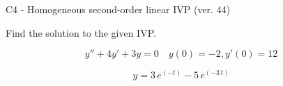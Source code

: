 \begin{exercise}
  \begin{exerciseTitle}C4 - Homogeneous second-order linear IVP (ver. 44)\end{exerciseTitle}
  \begin{exerciseStatement}
    
Find the solution to the given IVP.

    
\[y''+4y'+3y = 0 \hspace{1em} y(0) = -2 , y'(0) = 12\]

  \end{exerciseStatement}
  \begin{exerciseAnswer}
    
\[y= 3 \, e^{\left(-t\right)} - 5 \, e^{\left(-3 \, t\right)}\]

  \end{exerciseAnswer}
\end{exercise}
